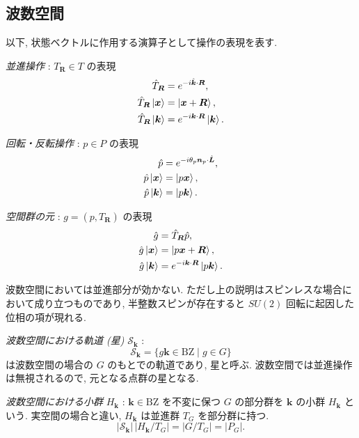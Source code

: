 \documentclass[12pt]{article}
\newcommand{\vect}[1]{\boldsymbol{#1}}
\begin{document}
\subsection{波数空間}

以下, 状態ベクトルに作用する演算子として操作の表現を表す.

\emph{並進操作} : $T_{\vect{R}} \in T$ の表現
\begin{align}
 \hat{T}_{\vect{R}} &= e^{-i \hat{\vect{k}} \cdot \vect{R}}, \\
 \hat{T}_{\vect{R}} \ket{\vect{x}} &= \ket{\vect{x} + \vect{R}}, \\
 \hat{T}_{\vect{R}} \ket{\vect{k}} &= e^{-i \vect{k} \cdot \vect{R}} \ket{\vect{k}}.
\end{align}

\emph{回転・反転操作} : $p \in P$ の表現
\begin{align}
 \hat{p} &= e^{-i \theta_p \vect{n}_p \cdot \hat{\vect{L}}}, \\
 \hat{p} \ket{\vect{x}} &= \ket{p \vect{x}}, \\
 \hat{p} \ket{\vect{k}} &= \ket{p \vect{k}}.
\end{align}

\emph{空間群の元} : $g = (p,T_{\vect{R}})$ の表現
\begin{align}
 \hat{g} &= \hat{T}_{\vect{R}} \hat{p}, \\
 \hat{g} \ket{\vect{x}} &= \ket{p \vect{x} + \vect{R}}, \\
 \hat{g} \ket{\vect{k}} &= e^{-i \vect{k} \cdot \vect{R}} \ket{p \vect{k}}.
\end{align}

波数空間においては並進部分が効かない.
ただし上の説明はスピンレスな場合において成り立つものであり, 半整数スピンが存在すると $SU(2)$ 回転に起因した位相の項が現れる.

\emph{波数空間における軌道 (星)} $\mathcal{S}_{\vect{k}}$ :
\begin{equation}
 \mathcal{S}_{\vect{k}} = \{ g \vect{k} \in \mathrm{BZ} \mid g \in G \}
\end{equation}
は波数空間の場合の $G$ のもとでの軌道であり, 星と呼ぶ. 波数空間では並進操作は無視されるので, 元となる点群の星となる.

\emph{波数空間における小群} $H_{\vect{k}}$ : $\vect{k} \in \mathrm{BZ}$ を不変に保つ $G$ の部分群を $\vect{k}$ の小群 $H_{\vect{k}}$ という. 実空間の場合と違い, $H_{\vect{k}}$ は並進群 $T_G$ を部分群に持つ.
\begin{equation}
 |\mathcal{S}_{\vect{k}}|\,|H_{\vect{k}} / T_G| = |G / T_G| = |P_G|.
\end{equation}
\end{document}
